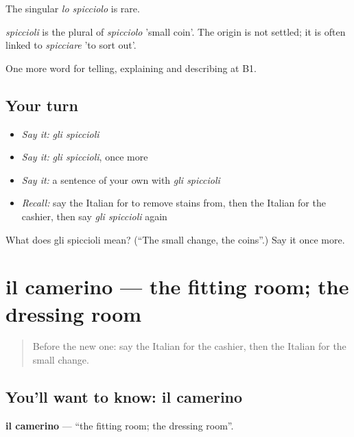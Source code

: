 The singular \emph{lo spicciolo} is rare.

\begin{cousinweb}
\emph{spiccioli} is the plural of \emph{spicciolo} 'small coin'. The origin is not settled; it is often linked to \emph{spicciare} 'to sort out'.
\end{cousinweb}

\begin{grammarlens}[title={What you've built}]
One more word for telling, explaining and describing at B1.
\end{grammarlens}

\subsection*{Your turn}
\begin{itemize}
\raggedright
  \item \emph{Say it:} \emph{gli spiccioli}
  \item \emph{Say it:} \emph{gli spiccioli}, once more
  \item \emph{Say it:} a sentence of your own with \emph{gli spiccioli}
  \item \emph{Recall:} say the Italian for to remove stains from, then the Italian for the cashier, then say \emph{gli spiccioli} again
\end{itemize}

\begin{tcolorbox}[breakable,colback=teal!4,colframe=teal!35!black,title={Before you move on}]
What does gli spiccioli mean? (\textquotedblleft{}The small change, the coins\textquotedblright{}.) Say it once more.
\end{tcolorbox}
\section[il camerino]{il camerino — the fitting room; the dressing room}

\label{lesson:IT-C457-camerino}



\begin{quote}
Before the new one: say the Italian for the cashier, then the Italian for the small change.
\end{quote}

\subsection*{You'll want to know: il camerino}
\textbf{il camerino} — \textquotedblleft{}the fitting room; the dressing room\textquotedblright{}.

